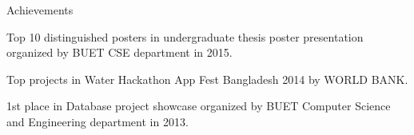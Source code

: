 
\begin{rSection}{Achievements}
\begin{rBullets}

\item Top 10 distinguished posters in undergraduate thesis poster presentation organized by BUET CSE department in 2015.
\item Top projects in Water Hackathon App Fest Bangladesh 2014 by WORLD BANK.
\item 1st place in Database project showcase organized by BUET Computer Science and Engineering department in 2013.

\end{rBullets}
\end{rSection}